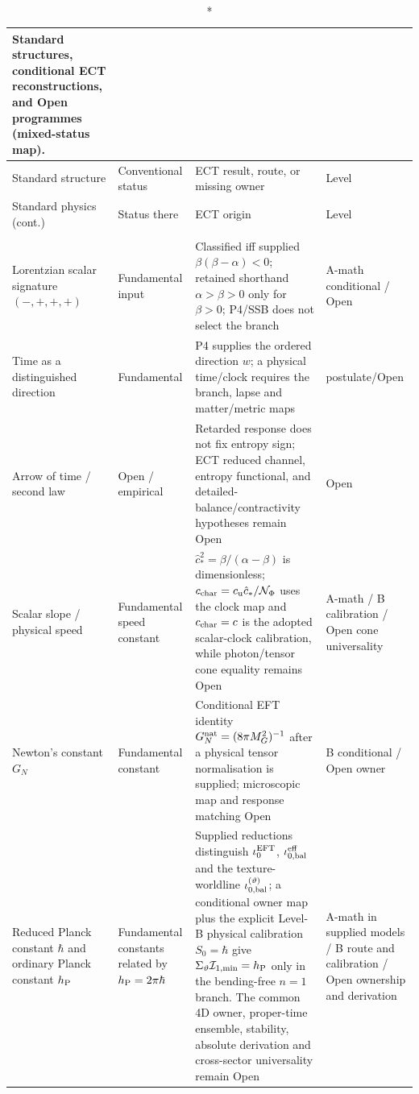 \documentclass[11pt,a4paper]{article}
\begin{document}
\renewcommand{\arraystretch}{1.15}
\begin{longtable}{@{}p{4.5cm}p{2.5cm}p{4.7cm}p{2.2cm}@{}}
\caption*{\textbf{Standard structures, conditional ECT reconstructions, and Open programmes (mixed-status map).}}\\[-4pt]
\toprule
Standard structure & Conventional status & ECT result, route, or missing owner & Level \\
\midrule
\endfirsthead
\toprule
Standard physics (cont.) & Status there & ECT origin & Level \\
\midrule
\endhead
\bottomrule
\endfoot
\multicolumn{4}{@{}l}{\textbf{Foundations and spacetime}}\\
\midrule
Lorentzian scalar signature $(-,+,+,+)$ & Fundamental input & Classified iff supplied $\beta(\beta-\alpha)<0$; retained shorthand $\alpha>\beta>0$ only for $\beta>0$; P4/SSB does not select the branch & A-math conditional / Open \\
Time as a distinguished direction & Fundamental & P4 supplies the ordered direction $w$; a physical time/clock requires the branch, lapse and matter/metric maps & postulate/Open \\
Arrow of time / second law & Open / empirical & Retarded response does not fix entropy sign; ECT reduced channel, entropy functional, and detailed-balance/contractivity hypotheses remain Open & Open \\
Scalar slope / physical speed & Fundamental speed constant & $\hat c_*^2=\beta/(\alpha-\beta)$ is dimensionless; $c_{\rm char}=c_{\rm u}\hat c_*/\mathcal N_\Phi$ uses the clock map and $c_{\rm char}=c$ is the adopted scalar-clock calibration, while photon/tensor cone equality remains Open & A-math / B calibration / Open cone universality \\
Newton's constant $G_N$ & Fundamental constant & Conditional EFT identity
$G_N^{\rm nat}=(8\pi M_G^2)^{-1}$ after a physical tensor normalisation is
supplied; microscopic map and response matching Open & B conditional / Open owner \\
Reduced Planck constant $\hbar$ and ordinary Planck constant $h_{\rm P}$ & Fundamental constants related by $h_{\rm P}=2\pi\hbar$ & Supplied reductions distinguish $\iota_0^{\rm EFT}$, $\iota_{0,\rm bal}^{\rm eff}$ and the texture-worldline $\iota_{0,\rm bal}^{(\vartheta)}$; a conditional owner map plus the explicit Level-B physical calibration $S_0=\hbar$ give $\Sigma_\vartheta\mathcal I_{1,\min}=h_{\rm P}$ only in the bending-free $n=1$ branch.  The common 4D owner, proper-time ensemble, stability, absolute derivation and cross-sector universality remain Open & A-math in supplied models / B route and calibration / Open ownership and derivation \\

\end{longtable}
\end{document}
